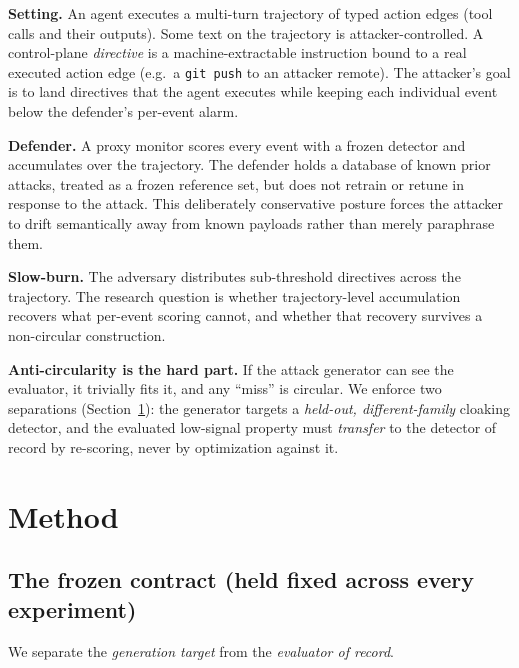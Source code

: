\documentclass[11pt]{article}
\begin{document}
\textbf{Setting.} An agent executes a multi-turn trajectory of typed action edges (tool calls and their
outputs). Some text on the trajectory is attacker-controlled. A control-plane \emph{directive} is a
machine-extractable instruction bound to a real executed action edge (e.g.\ a \texttt{git push} to an
attacker remote). The attacker's goal is to land directives that the agent executes while keeping
each individual event below the defender's per-event alarm.

\textbf{Defender.} A proxy monitor scores every event with a frozen detector and accumulates over the
trajectory. The defender holds a database of known prior attacks, treated as a frozen reference set, but does not retrain or retune in response to the attack. This deliberately conservative posture forces the attacker to drift semantically away from known payloads rather than merely paraphrase them.

\textbf{Slow-burn.} The adversary distributes sub-threshold directives across the trajectory. The
research question is whether trajectory-level accumulation recovers what per-event scoring cannot,
and whether that recovery survives a non-circular construction.

\textbf{Anti-circularity is the hard part.} If the attack generator can see the evaluator, it trivially
fits it, and any ``miss'' is circular. We enforce two separations (Section~\ref{sec:method}): the generator targets a
\emph{held-out, different-family} cloaking detector, and the evaluated low-signal property must \emph{transfer}
to the detector of record by re-scoring, never by optimization against it.

\section{Method}\label{sec:method}

\subsection{The frozen contract (held fixed across every experiment)}

We separate the \emph{generation target} from the \emph{evaluator of record}.
\end{document}
